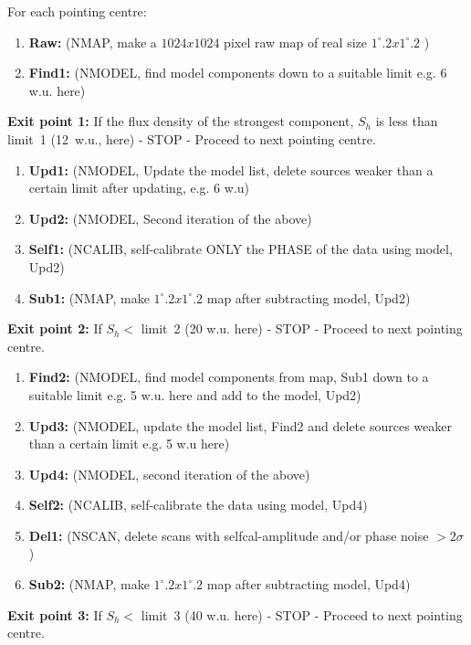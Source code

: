 For each pointing centre:

\begin{enumerate}
\item {\bf Raw:} (NMAP, make a $1024 x 1024$ pixel raw map of real size
$1^\circ .2 x 1^\circ .2$ )
\item {\bf Find1:} (NMODEL, find model components down to a suitable limit e.g.
6 w.u. here)
\end{enumerate}

{\bf Exit point 1:} If the flux density of the strongest component, $S_{h}$ is
less than limit~1 (12~w.u., here) - STOP - Proceed to next pointing centre.

\begin{enumerate}
\item {\bf Upd1:} (NMODEL, Update the model list, delete sources weaker than a
certain limit after updating, e.g. 6 w.u)
\item {\bf Upd2:} (NMODEL, Second iteration of the above)
\item {\bf Self1:} (NCALIB, self-calibrate ONLY the PHASE of the data using
model, Upd2)
\item {\bf Sub1:} (NMAP, make $1^\circ .2 x 1^\circ .2$ map after subtracting
model, Upd2)
\end{enumerate}

{\bf Exit point 2:} If $S_{h} < $  limit~2 (20 w.u. here) - STOP - Proceed to
next pointing centre.

\begin{enumerate}
\item {\bf Find2:} (NMODEL, find model components from map, Sub1 down to a
suitable limit e.g. 5 w.u. here and add to the model, Upd2)
\item {\bf Upd3:} (NMODEL, update the model list, Find2 and  delete sources
weaker than a certain limit e.g. 5 w.u here)
\item {\bf Upd4:} (NMODEL, second iteration of the above)
\item {\bf Self2:} (NCALIB, self-calibrate the data using model, Upd4)
\item {\bf Del1:} (NSCAN, delete scans with selfcal-amplitude and/or phase
noise $ > 2 \sigma$)
\item {\bf Sub2:} (NMAP, make $1^\circ .2 x 1^\circ .2$  map after subtracting
model, Upd4)
\end{enumerate}

{\bf Exit point 3:} If $S_{h} < $  limit~3 (40 w.u. here) - STOP - Proceed to
next pointing centre.

